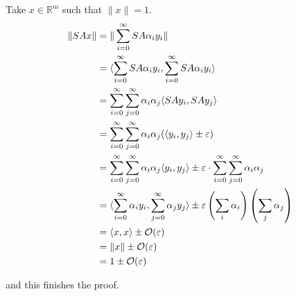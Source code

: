 \documentclass[11pt]{article}
\begin{document}
Take $x \in \mathbb{R}^m$ such that $\|x\| = 1$.
\begin{align*}
\|SAx\| &= \| \sum_{i=0}^{\infty} SA \alpha_i y_i \|\\
&= \langle \sum_{i=0}^{\infty} SA \alpha_i y_i , \sum_{i=0}^{\infty} SA \alpha_i y_i  \rangle\\
&= \sum_{i=0}^{\infty} \sum_{j=0}^{\infty} \alpha_i \alpha_j \langle SAy_i, SAy_j \rangle\\
&= \sum_{i=0}^{\infty} \sum_{j=0}^{\infty} \alpha_i \alpha_j ( \langle y_i, y_j \rangle \pm \varepsilon)\\
&= \sum_{i=0}^{\infty} \sum_{j=0}^{\infty} \alpha_i \alpha_j \langle y_i, y_j \rangle \pm \varepsilon \cdot \sum_{i=0}^{\infty} \sum_{j=0}^{\infty} \alpha_i \alpha_j\\
&= \langle \sum_{i=0}^{\infty} \alpha_i y_i, \sum_{j=0}^{\infty} \alpha_j y_j \rangle \pm \varepsilon \left( \sum_i \alpha_i \right) \left( \sum_j \alpha_j \right)\\
&= \langle x, x\rangle \pm \mathcal{O}(\varepsilon)\\
&= \|x\| \pm \mathcal{O}(\varepsilon)\\
&= 1 \pm \mathcal{O}(\varepsilon)
\end{align*}

and this finishes the proof.



\end{document}
